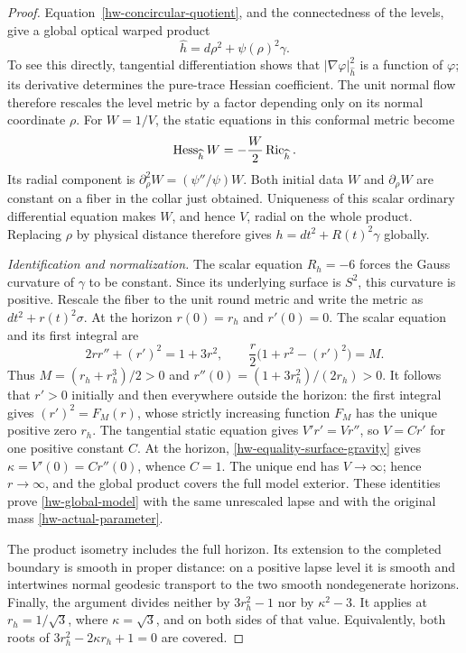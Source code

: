 \begin{proof}
Equation~\eqref{hw-concircular-quotient}, and the connectedness
of the levels, give a global optical warped product
\[
 \widehat h=d\rho^2+\psi(\rho)^2\gamma.
\]
To see this directly, tangential differentiation shows that
$|\nabla\varphi|_{\widehat h}^2$ is a function of $\varphi$;
its derivative determines the pure-trace Hessian coefficient.
The unit normal flow therefore rescales the level metric by a
factor depending only on its normal coordinate $\rho$.
For $W=1/V$, the static equations in this conformal metric become
\[
 \operatorname{Hess}_{\widehat h}W=-\frac W2\operatorname{Ric}_{\widehat h}.
\]
Its radial component is
$\partial_\rho^2W=(\psi''/\psi)W$.
Both initial data $W$ and $\partial_\rho W$ are constant on a
fiber in the collar just obtained.  Uniqueness of this scalar
ordinary differential equation makes $W$, and hence $V$, radial
on the whole product.  Replacing $\rho$ by physical distance
therefore gives $h=dt^2+R(t)^2\gamma$ globally.

\emph{Identification and normalization.}
The scalar equation $R_h=-6$ forces the Gauss curvature of
$\gamma$ to be constant.  Since its underlying surface is $S^2$,
this curvature is positive.  Rescale the fiber to the unit round
metric and write the metric as $dt^2+r(t)^2\sigma$.
At the horizon $r(0)=r_h$ and $r'(0)=0$.
The scalar equation and its first integral are
\[
 2rr''+(r')^2=1+3r^2,\qquad
 \frac r2\bigl(1+r^2-(r')^2\bigr)=M.
\]
Thus $M=(r_h+r_h^3)/2>0$ and
$r''(0)=(1+3r_h^2)/(2r_h)>0$.
It follows that $r'>0$ initially and then everywhere outside
the horizon: the first integral gives $(r')^2=F_M(r)$, whose
strictly increasing function $F_M$ has the unique positive zero
$r_h$.
The tangential static equation gives
$V'r'=Vr''$, so $V=C r'$ for one positive constant $C$.
At the horizon, \eqref{hw-equality-surface-gravity} gives
$\kappa=V'(0)=C r''(0)$, whence $C=1$.
The unique end has $V\to\infty$; hence $r\to\infty$, and the
global product covers the full model exterior.
These identities prove \eqref{hw-global-model} with the same
unrescaled lapse and with the original mass
\eqref{hw-actual-parameter}.

The product isometry includes the full horizon.  Its extension to
the completed boundary is smooth in proper distance: on a
positive lapse level it is smooth and intertwines normal geodesic
transport to the two smooth nondegenerate horizons.
Finally, the argument divides neither by $3r_h^2-1$ nor by
$\kappa^2-3$.  It applies at $r_h=1/\sqrt3$, where
$\kappa=\sqrt3$, and on both sides of that value.  Equivalently,
both roots of $3r_h^2-2\kappa r_h+1=0$ are covered.
\end{proof}

